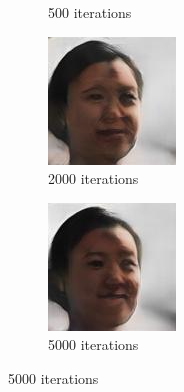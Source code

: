 \documentclass{article}
\begin{document}
\begin{figure}[h!]
\begin{subfigure}[b]{0.24\textwidth}
         \caption{500 iterations}
     \end{subfigure}
     \begin{subfigure}[b]{0.24\textwidth}
         \centering
         \includegraphics[width=\textwidth]{illustration/face_sngan_2000.jpg}
         \caption{2000 iterations}
     \end{subfigure}
     \begin{subfigure}[b]{0.24\textwidth}
         \centering
         \includegraphics[width=\textwidth]{illustration/face_sngan_5000.jpg}
         \caption{5000 iterations}
     \end{subfigure}
\end{figure}
\end{document}

